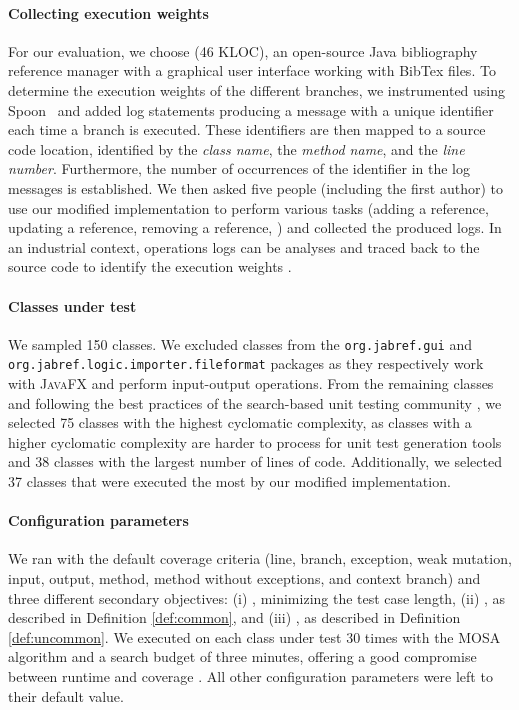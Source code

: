 \paragraph{Collecting execution weights}
%
For our evaluation, we choose \jabref (46 KLOC), an open-source Java bibliography reference manager with a graphical user interface working with BibTex files. To determine the execution weights of the different branches, we instrumented \jabref using Spoon~\cite{pawlak:hal-01169705} and added log statements producing a message with a unique identifier each time a branch is executed. These identifiers are then mapped to a source code location, identified by the \emph{class name}, the \emph{method name}, and the \emph{line number}. Furthermore, the number of occurrences of the identifier in the log messages is established. We then asked five people (including the first author) to use our modified \jabref implementation to perform various tasks (adding a reference, updating a reference, removing a reference, \etc) and collected the produced logs. In an industrial context, operations logs can be analyses and traced back to the source code to identify the execution weights \cite{Winter2019}. 

\paragraph{Classes under test}
%
We sampled 150 classes. We excluded classes from the \texttt{org.\-jab\-ref.gui} and \texttt{org.jabref.\-logic.importer.fileformat} packages as they respectively work with \textsc{JavaFX} and perform input-output operations. 
From the remaining classes and following the best practices of the search-based unit testing community \cite{Molina2018}, we selected 75 classes with the highest cyclomatic complexity, as classes with a higher cyclomatic complexity are harder to process for unit test generation tools and 38 classes with the largest number of lines of code. Additionally, we selected 37 classes that were executed the most by our modified \jabref implementation. 

\paragraph{Configuration parameters}
%
We ran \evosuite with the default coverage criteria (line, branch, exception, weak mutation, input, output, method, method without exceptions, and context branch) and three different secondary objectives: 
(i) \df, minimizing the test case length,
(ii) \com, as described in Definition \ref{def:common}, 
and (iii) \ucom, as described in Definition \ref{def:uncommon}.
We executed \evosuite on each class under test 30 times with the MOSA algorithm \cite{Panichella2015} and a search budget of three minutes, offering a good compromise between runtime and coverage \cite{Fraser2014b, Panichella2018a}. All other configuration parameters were left to their default value. 


